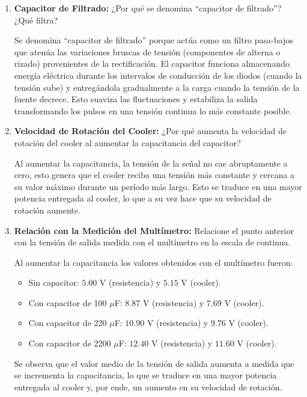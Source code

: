 \begin{enumerate}
    \item \textbf{Capacitor de Filtrado:}
    ¿Por qué se denomina ``capacitor de filtrado''? ¿Qué filtra?
    
    \begin{tcolorbox}[colback=white, colframe=gray!50, title=Respuesta]
        Se denomina ``capacitor de filtrado'' porque actúa como un filtro pasa-bajos que atenúa las variaciones bruscas de tensión (componentes de alterna o rizado) provenientes de la rectificación. El capacitor funciona almacenando energía eléctrica durante los intervalos de conducción de los diodos (cuando la tensión sube) y entregándola gradualmente a la carga cuando la tensión de la fuente decrece. Esto suaviza las fluctuaciones y estabiliza la salida transformando los pulsos en una tensión continua lo más constante posible.
    \end{tcolorbox}

    \item \textbf{Velocidad de Rotación del Cooler:}
    ¿Por qué aumenta la velocidad de rotación del cooler al aumentar la capacitancia del capacitor?
    
    \begin{tcolorbox}[colback=white, colframe=gray!50, title=Respuesta]
        Al aumentar la capacitancia, la tensión de la señal no cae abruptamente a cero, esto genera que el cooler reciba una tensión más constante y cercana a su valor máximo durante un período más largo. Esto se traduce en una mayor potencia entregada al cooler, lo que a su vez hace que su velocidad de rotación aumente.
    \end{tcolorbox}

    \item \textbf{Relación con la Medición del Multímetro:}
    Relacione el punto anterior con la tensión de salida medida con el multímetro en la escala de continua.
    
    \begin{tcolorbox}[colback=white, colframe=gray!50, title=Respuesta]
        Al aumentar la capacitancia los valores obtenidos con el multímetro fueron:
        \begin{itemize}
            \item Sin capacitor: $\text{5.00 V}$ (resistencia) y $\text{5.15 V}$ (cooler).
            \item Con capacitor de 100 $\mu$F: $\text{8.87 V}$ (resistencia) y $\text{7.69 V}$ (cooler).
            \item Con capacitor de 220 $\mu$F: $\text{10.90 V}$ (resistencia) y $\text{9.76 V}$ (cooler).
            \item Con capacitor de 2200 $\mu$F: $\text{12.40 V}$ (resistencia) y $\text{11.60 V}$ (cooler).
        \end{itemize}
        Se observa que el valor medio de la tensión de salida aumenta a medida que se incrementa la capacitancia, lo que se traduce en una mayor potencia entregada al cooler y, por ende, un aumento en su velocidad de rotación.
    \end{tcolorbox}


\end{enumerate}

